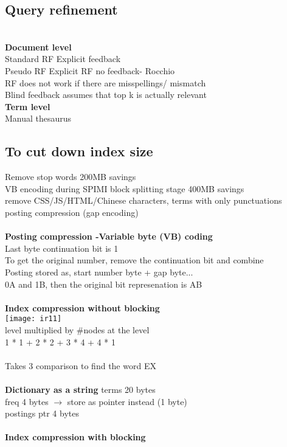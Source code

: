 \documentclass[11pt]{article}
\begin{document}
\begin{multicols*}{3}
\subsection*{Query refinement}\\
\textbf{Document level}\\
Standard RF Explicit feedback\\
Pseudo RF Explicit RF no feedback- Rocchio\\
RF does not work if there are misspellings/ mismatch
\\
Blind feedback assumes that top k is actually relevant\\
\textbf{Term level}\\
Manual thesaurus
\subsection*{To cut down index size}
Remove stop words 200MB savings\\
VB encoding during SPIMI block splitting stage 400MB savings\\
remove CSS/JS/HTML/Chinese characters, terms with only punctuations
posting compression (gap encoding)\\\\
\textbf{Posting compression -Variable byte (VB) coding}\\
Last byte continuation bit is 1\\
To get the original number, remove the continuation bit and combine\\
Posting stored as, start number byte + gap byte...\\
0A and 1B, then the original bit represenation is AB\\\\
\textbf{Index compression without blocking}\\
\texttt{[image: ir11]}\\
level multiplied by \#nodes at the level\\
1 * 1 + 2 * 2 + 3 * 4 + 4 * 1\\\\
Takes 3 comparison to find the word EX \\\\
\textbf{Dictionary as a string}
terms 20 bytes\\
freq 4 bytes $\rightarrow$ store as pointer instead (1 byte)\\ 
postings ptr 4 bytes\\\\
\textbf{Index compression with blocking}\\

\end{multicols*}
\end{document}

